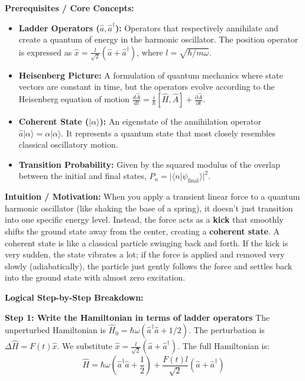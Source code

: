 \begin{solution}
\textbf{Prerequisites / Core Concepts:}
\begin{itemize}
    \item \textbf{Ladder Operators ($\hat{a}, \hat{a}^\dagger$):} Operators that respectively annihilate and create a quantum of energy in the harmonic oscillator. The position operator is expressed as $\hat{x} = \frac{l}{\sqrt{2}}(\hat{a} + \hat{a}^\dagger)$, where $l = \sqrt{\hbar / m\omega}$.
    \item \textbf{Heisenberg Picture:} A formulation of quantum mechanics where state vectors are constant in time, but the operators evolve according to the Heisenberg equation of motion $\frac{d\hat{A}}{dt} = \frac{i}{\hbar}[\hat{H}, \hat{A}] + \frac{\partial \hat{A}}{\partial t}$.
    \item \textbf{Coherent State ($|\alpha\rangle$):} An eigenstate of the annihilation operator $\hat{a}|\alpha\rangle = \alpha|\alpha\rangle$. It represents a quantum state that most closely resembles classical oscillatory motion.
    \item \textbf{Transition Probability:} Given by the squared modulus of the overlap between the initial and final states, $P_n = |\langle n | \psi_{\text{final}} \rangle|^2$.
\end{itemize}

\textbf{Intuition / Motivation:}
When you apply a transient linear force to a quantum harmonic oscillator (like shaking the base of a spring), it doesn't just transition into one specific energy level. Instead, the force acts as a \textbf{kick} that smoothly shifts the ground state away from the center, creating a \textbf{coherent state}. A coherent state is like a classical particle swinging back and forth. If the kick is very sudden, the state vibrates a lot; if the force is applied and removed very slowly (adiabatically), the particle just gently follows the force and settles back into the ground state with almost zero excitation.

\textbf{Logical Step-by-Step Breakdown:}

\textbf{Step 1: Write the Hamiltonian in terms of ladder operators}
The unperturbed Hamiltonian is $\hat{H}_0 = \hbar\omega(\hat{a}^\dagger \hat{a} + 1/2)$.
The perturbation is $\Delta\hat{H} = F(t)\hat{x}$. We substitute $\hat{x} = \frac{l}{\sqrt{2}}(\hat{a} + \hat{a}^\dagger)$.
The full Hamiltonian is:
\[ \hat{H} = \hbar\omega\left(\hat{a}^\dagger \hat{a} + \frac{1}{2}\right) + \frac{F(t)l}{\sqrt{2}}(\hat{a} + \hat{a}^\dagger) \]


\end{solution}
